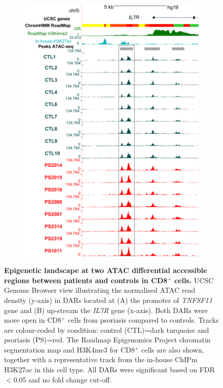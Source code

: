 \begin{figure}[htbp]
\begin{subfigure}{0.45\textwidth}
\includegraphics[width=\textwidth]{./Results2/pdfs/UCSC_ATAC_CD8_normalised_peak_enh_IL7R}
\caption{\textbf{}}
\end{subfigure}
\caption[Epigenetic landscape at two ATAC differential accessible regions between patients and controls in CD8$^+$ cells.]{\textbf{Epigenetic landscape at two ATAC differential accessible regions between patients and controls in CD8$^+$ cells.} UCSC Genome Browser view illustrating the normalised ATAC read density (y-axis) in DARs located at (A) the promoter of \textit{TNFSF11} gene and (B) up-stream the \textit{IL7R} gene (x-axis). Both DARs were more open in CD8$^+$ cells from psoriasis compared to controls. Tracks are colour-coded by condition: control (CTL)=dark turquoise and psoriasis (PS)=red. The Roadmap Epigenomics Project chromatin segmentation map and H3K4me3 for CD8$^+$ cells are also shown, together with a representative track from the in-house ChIPm H3K27ac in this cell type. All DARs were significant based on FDR$<$0.05 and no fold change cut-off.}
\label{figure:ATAC_PS_CTL_CD8_TNFSF11_IL7R_tracks}
\end{figure} 




